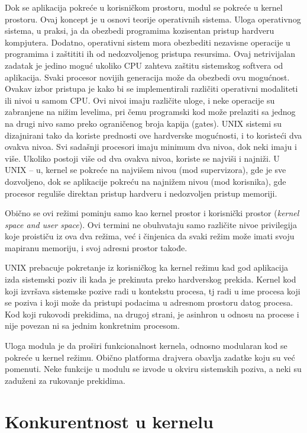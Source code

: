 \documentclass[a4paper, 12pt, diplomski]{etf}
\begin{document}
	Dok se aplikacija pokreće u korisničkom prostoru, modul se pokreće u kernel prostoru. Ovaj koncept je u osnovi teorije operativnih sistema. Uloga operativnog sistema, u praksi, ja da obezbedi programima kozisentan pristup hardveru kompjutera. Dodatno, operativni sistem mora obezbediti nezavisne operacije u programima i zaštititi ih od nedozvoljenog pristupa resursima. Ovaj netrivijalan zadatak je jedino moguć ukoliko CPU zahteva zaštitu sistemskog softvera od aplikacija. Svaki procesor novijih generacija može da obezbedi ovu mogućnost. Ovakav izbor pristupa je kako bi se implementirali različiti operativni modaliteti ili nivoi u samom CPU. Ovi nivoi imaju različite uloge, i neke operacije su zabranjene na nižim levelima, pri čemu programski kod može prelaziti sa jednog na drugi nivo samo preko ograničenog broja kapija (gates). UNIX sistemi su dizajnirani tako da koriste prednosti ove hardverske mogućnosti, i to koristeći dva ovakva nivoa. Svi sadašnji procesori imaju minimum dva nivoa, dok neki imaju i više. Ukoliko postoji više od dva ovakva nivoa, koriste se najviši i najniži. U UNIX – u, kernel se pokreće na najvišem nivou (mod supervizora), gde je sve dozvoljeno, dok se aplikacije pokreću na najnižem nivou (mod korisnika), gde procesor reguliše direktan pristup hardveru i nedozvoljen pristup memoriji.

	Obično se ovi režimi pominju samo kao kernel prostor i korisnički prostor (\textit{kernel space and user space}). Ovi termini ne obuhvataju samo različite nivoe privilegija koje proističu iz ova dva režima, već i činjenica da svaki režim može imati svoju mapiranu memoriju, i svoj adresni prostor takođe.

	UNIX prebacuje pokretanje iz korisničkog ka kernel režimu kad god aplikacija izda sistemski poziv ili kada je prekinuta preko hardverskog prekida. Kernel kod koji izvršava sistemske pozive radi u kontekstu procesa, tj radi u ime procesa koji se poziva i koji može da pristupi podacima u adresnom prostoru datog procesa. Kod koji rukovodi prekidima, na drugoj strani, je asinhron u odnosu na procese i nije povezan ni sa jednim konkretnim procesom.

	Uloga modula je da proširi funkcionalnost kernela, odnosno modularan kod se pokreće u kernel režimu. Obično platforma drajvera obavlja zadatke koju su već pomenuti. Neke funkcije u modulu se izvode u okviru sistemskih poziva, a neki su zaduženi za rukovanje prekidima.

	\section{Konkurentnost u kernelu}
\end{document}
